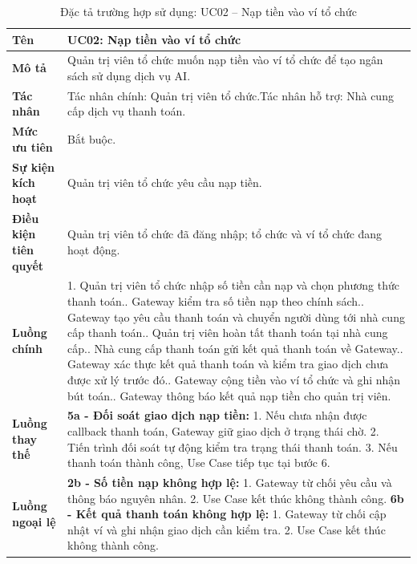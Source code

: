 \begin{longtable}{|L{4.2cm}|L{9.5cm}|}
\caption[Đặc tả UC02]{Đặc tả trường hợp sử dụng: UC02 -- Nạp tiền vào ví tổ chức} \\\hline
\textbf{Tên} & UC02: Nạp tiền vào ví tổ chức \\\hline
\textbf{Mô tả} & Quản trị viên tổ chức muốn nạp tiền vào ví tổ chức để tạo ngân sách sử dụng dịch vụ AI.\\\hline
\textbf{Tác nhân} & Tác nhân chính: Quản trị viên tổ chức.\newline Tác nhân hỗ trợ: Nhà cung cấp dịch vụ thanh toán.\\\hline
\textbf{Mức ưu tiên} & Bắt buộc.\\\hline
\textbf{Sự kiện kích hoạt} & Quản trị viên tổ chức yêu cầu nạp tiền.\\\hline
\textbf{Điều kiện tiên quyết} & Quản trị viên tổ chức đã đăng nhập; tổ chức và ví tổ chức đang hoạt động.\\\hline
\textbf{Luồng chính} &
1. Quản trị viên tổ chức nhập số tiền cần nạp và chọn phương thức thanh toán.. Gateway kiểm tra số tiền nạp theo chính sách.. Gateway tạo yêu cầu thanh toán và chuyển người dùng tới nhà cung cấp thanh toán.. Quản trị viên hoàn tất thanh toán tại nhà cung cấp.. Nhà cung cấp thanh toán gửi kết quả thanh toán về Gateway.. Gateway xác thực kết quả thanh toán và kiểm tra giao dịch chưa được xử lý trước đó.. Gateway cộng tiền vào ví tổ chức và ghi nhận bút toán.. Gateway thông báo kết quả nạp tiền cho quản trị viên.\\\hline
\textbf{Luồng thay thế} &
\textbf{5a - Đối soát giao dịch nạp tiền:} 1. Nếu chưa nhận được callback thanh toán, Gateway giữ giao dịch ở trạng thái chờ. 2. Tiến trình đối soát tự động kiểm tra trạng thái thanh toán. 3. Nếu thanh toán thành công, Use Case tiếp tục tại bước 6.\\\hline
\textbf{Luồng ngoại lệ} &
\textbf{2b - Số tiền nạp không hợp lệ:} 1. Gateway từ chối yêu cầu và thông báo nguyên nhân. 2. Use Case kết thúc không thành công.\newline
\textbf{6b - Kết quả thanh toán không hợp lệ:} 1. Gateway từ chối cập nhật ví và ghi nhận giao dịch cần kiểm tra. 2. Use Case kết thúc không thành công.\newline

\end{longtable}
